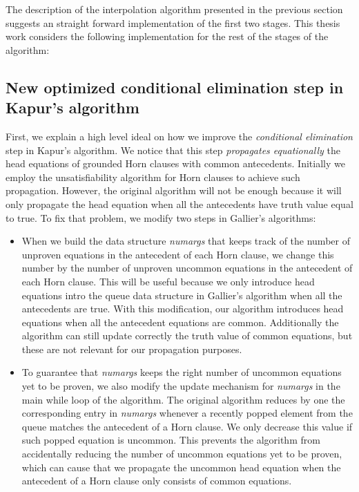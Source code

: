 The description of the interpolation algorithm presented in the
previous section suggests an straight forward implementation
of the first two stages. This thesis work considers the following
implementation for the rest of the stages of the algorithm:

\subsection{New optimized conditional elimination step in Kapur's algorithm}

First, we explain a high level ideal on how 
we improve the \emph{conditional elimination}
step in Kapur's algorithm. We notice that this 
step \emph{propagates equationally} the
head equations of grounded Horn clauses with 
common antecedents. Initially we employ the
unsatisfiability algorithm for Horn clauses 
to achieve such propagation. However, the original
algorithm will not be enough because it will 
only propagate the head equation when all the
antecedents have truth value equal to 
true. To fix that problem, we modify two steps in Gallier's
algorithms:

\begin{itemize}
  \item When we build the data structure \emph{numargs} that keeps 
    track of the number of unproven
    equations in the antecedent of each Horn clause, we change 
    this number by the number
    of unproven uncommon equations in the antecedent of each 
    Horn clause. This will be useful
    because we only introduce head equations intro the queue 
    data structure in Gallier's algorithm
    when all the antecedents are true. With this 
    modification, our algorithm introduces head equations
    when all the antecedent equations are common. 
    Additionally the algorithm can still update
    correctly the truth value of common equations, 
    but these are not relevant for our propagation
    purposes.
  \item To guarantee that \emph{numargs} keeps the 
    right number of uncommon equations yet to
    be proven, we also modify the update mechanism for 
    \emph{numargs} in the main while loop of the algorithm.
    The original algorithm reduces by one the 
    corresponding entry in \emph{numargs}
    whenever a recently popped element from the queue 
    matches the antecedent of a Horn clause. We only
    decrease this value if such popped equation is uncommon. 
    This prevents the algorithm from accidentally
    reducing the number of uncommon equations yet to be proven, 
    which can cause that we propagate the
    uncommon head equation when the antecedent of a Horn 
    clause only consists of common equations.
\end{itemize}

